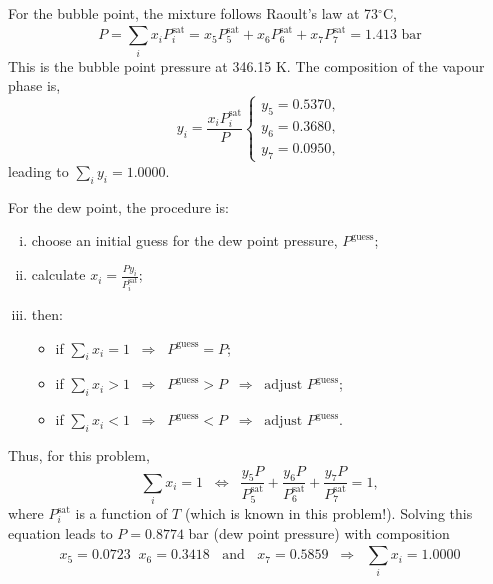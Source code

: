 \documentclass[12pts,a4paper,amsmath,amssymb,floatfix]{article}%
\newcommand{\frc}{\displaystyle\frac}
\newcommand{\summation}[3][error]{\sum\limits_{#2}^{#3}#1}
\begin{document}
\begin{enumerate}[1)]
   For the bubble point, the mixture follows Raoult's law at 73$^{\circ}$C,
      \begin{displaymath}
          P = \summation[x_{i}P_{i}^{\text{sat}}]{i}{} = x_{5}P_{5}^{\text{sat}} + x_{6}P_{6}^{\text{sat}} + x_{7}P_{7}^{\text{sat}} = 1.413\text{ bar}
      \end{displaymath}
      This is the bubble point pressure at 346.15 K. The composition of the vapour phase is,
      \begin{displaymath}
             y_{i}=\frc{x_{i}P_{i}^{\text{sat}}}{P}
             \begin{cases}
                  y_{5} = 0.5370,\\
                  y_{6} = 0.3680,\\
                  y_{7} = 0.0950,
             \end{cases}
      \end{displaymath}
      leading to $\summation[y_{i}]{i}{} = 1.0000$.

\medskip

     For the dew point, the procedure is:
    \begin{enumerate}[i)]
       \item choose an initial guess for the dew point pressure, $P^{\text{guess}}$;
       \item calculate $x_{i}=\frc{Py_{i}}{P_{i}^{\text{sat}}}$;
       \item then:
           \begin{itemize}
              \item if $\summation[x_{i}]{i}{} = 1 \;\;\Rightarrow \;\; P^{\text{guess}} = P$;
              \item if $\summation[x_{i}]{i}{} > 1 \;\;\Rightarrow \;\; P^{\text{guess}} > P \;\; \Rightarrow\;\; \text{adjust } P^{\text{guess}}$;
              \item if $\summation[x_{i}]{i}{} < 1 \;\;\Rightarrow \;\; P^{\text{guess}} < P \;\; \Rightarrow\;\; \text{adjust } P^{\text{guess}}$.
           \end{itemize}
    \end{enumerate}
    Thus, for this problem,
    \begin{displaymath}
        \summation[x_{i}]{i}{} = 1\;\; \Longleftrightarrow \;\; \frc{y_{5}P}{P_{5}^{\text{sat}}} + \frc{y_{6}P}{P_{6}^{\text{sat}}} + \frc{y_{7}P}{P_{7}^{\text{sat}}} = 1,
    \end{displaymath}
    where $P_{i}^{\text{sat}}$ is a function of $T$ (which is known in this problem!).  Solving this equation leads to $P=0.8774$ bar (dew point pressure) with composition
    \begin{displaymath}
        x_{5} =0.0723\;\; x_{6} = 0.3418\;\;\text{ and }\;\;x_{7} = 0.5859\;\;\Rightarrow\;\; \summation[x_{i}]{i}{} = 1.0000
    \end{displaymath}



\end{enumerate}
\end{document}
